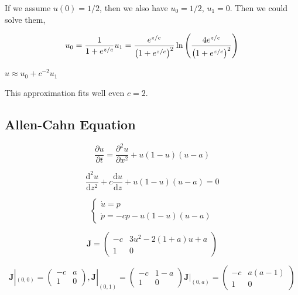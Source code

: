 \documentclass[
]{article}
\begin{document}
If we assume $u(0) = 1/2$, then we also have $u_{0} = 1/2$,
$u_{1} = 0$. Then we could solve them,

\begin{equation*}
u_{0} = \frac{1}{1 + e^{z/c}}\\
u_{1} = \frac{e^{z/c}}{\left( 1+ e^{z/c} \right)^2}\ln\left( \frac{4 e^{z/c}}{\left( 1+ e^{z/c} \right)^2} \right)
\end{equation*}

$u \approx u_{0} + c^{-2} u_{1}$

This approximation fits well even $c = 2$.

\subsection{Allen-Cahn Equation }\label{allen-cahn-equation}

\begin{equation*}
\frac{\partial u}{\partial t} = \frac{\partial ^2 u} {\partial x^2} +  u (1-u) (u-a)
\end{equation*}

\begin{equation*}
\frac{\mathrm{d}^2 u}{\mathrm{d} z^2} + c \frac{\mathrm{d} u}{\mathrm{d} z} + u(1-u)(u-a) = 0
\end{equation*}

$$
\begin{cases}
\dot{u} = p\\
\dot{p} = -cp - u(1-u)(u-a)
\end{cases}
$$

\begin{equation*}
\mathbf{J} = \begin{pmatrix}
-c & 3u^2 - 2(1+a)u +a \\
1 & 0 
\end{pmatrix}
\end{equation*}

\begin{equation*}
\mathbf{J}|_{(0,0)} = \begin{pmatrix}
-c & a\\
1 & 0 
\end{pmatrix}, 
\mathbf{J}|_{(0,1)} = \begin{pmatrix}
-c & 1-a\\
1 & 0 
\end{pmatrix}
\mathbf{J}|_{(0,a)} = \begin{pmatrix}
-c & a(a - 1) \\
1 & 0 
\end{pmatrix}
\end{equation*}
\end{document}
